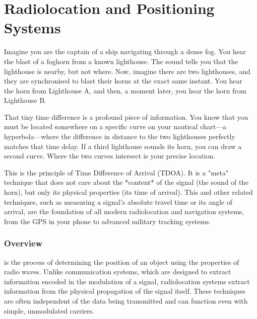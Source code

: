 
\chapter{Radiolocation and Positioning Systems}
\label{ch:radiolocation}

\begin{nontechnical}
    Imagine you are the captain of a ship navigating through a dense fog. You hear the blast of a foghorn from a known lighthouse. The sound tells you that the lighthouse is nearby, but not where. Now, imagine there are two lighthouses, and they are synchronised to blast their horns at the exact same instant. You hear the horn from Lighthouse A, and then, a moment later, you hear the horn from Lighthouse B.

    That tiny time difference is a profound piece of information. You know that you must be located somewhere on a specific curve on your nautical chart—a hyperbola—where the difference in distance to the two lighthouses perfectly matches that time delay. If a third lighthouse sounds its horn, you can draw a second curve. Where the two curves intersect is your precise location.

    This is the principle of Time Difference of Arrival (TDOA). It is a "meta" technique that does not care about the *content* of the signal (the sound of the horn), but only its physical properties (its time of arrival). This and other related techniques, such as measuring a signal's absolute travel time or its angle of arrival, are the foundation of all modern radiolocation and navigation systems, from the GPS in your phone to advanced military tracking systems.
\end{nontechnical}

\subsection{Overview}

 is the process of determining the position of an object using the properties of radio waves. Unlike communication systems, which are designed to extract information encoded in the modulation of a signal, radiolocation systems extract information from the physical propagation of the signal itself. These techniques are often independent of the data being transmitted and can function even with simple, unmodulated carriers.

